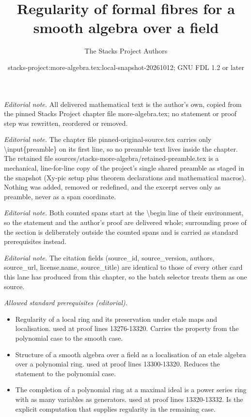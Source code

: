 \documentclass[10pt,a4paper]{amsart}
\title{Regularity of formal fibres for a smooth algebra over a field}
\author{The Stacks Project Authors}
\date{stacks-project:more-algebra.tex:local-snapshot-20261012; GNU FDL 1.2 or later}
\theoremstyle{plain}
\theoremstyle{definition}
\theoremstyle{remark}
\numberwithin{equation}{subsection}
\begin{document}
\maketitle
\setcounter{subsection}{1}
\noindent\textit{Editorial note.} All delivered mathematical text is the author's own, copied from the pinned Stacks Project chapter file more-algebra.tex; no statement or proof step was rewritten, reordered or removed.\par\medskip
\noindent\textit{Editorial note.} The chapter file pinned-original-source.tex carries only \textbackslash{}input\{preamble\} on its first line, so no preamble text lives inside the chapter. The retained file sources/stacks-more-algebra/retained-preamble.tex is a mechanical, line-for-line copy of the project's single shared preamble as staged in the snapshot (Xy-pic setup plus theorem declarations and mathematical macros). Nothing was added, removed or redefined, and the excerpt serves only as preamble, never as a span coordinate.\par\medskip
\noindent\textit{Editorial note.} Both counted spans start at the \textbackslash{}begin line of their environment, so the statement and the author's proof are delivered whole; surrounding prose of the section is deliberately outside the counted spans and is carried as standard prerequisites instead.\par\medskip
\noindent\textit{Editorial note.} The citation fields (source\_id, source\_version, authors, source\_url, license.name, source\_title) are identical to those of every other card this lane has produced from this chapter, so the batch selector treats them as one source.\par\medskip
\noindent\textit{Allowed standard prerequisites (editorial).}\begin{itemize}
\item Regularity of a local ring and its preservation under etale maps and localisation. used at proof lines 13276-13320. Carries the property from the polynomial case to the smooth case.
\item Structure of a smooth algebra over a field as a localisation of an etale algebra over a polynomial ring. used at proof lines 13300-13320. Reduces the statement to the polynomial case.
\item The completion of a polynomial ring at a maximal ideal is a power series ring with as many variables as generators. used at proof lines 13320-13332. Is the explicit computation that supplies regularity in the remaining case.
\end{itemize}\medskip
\end{document}
